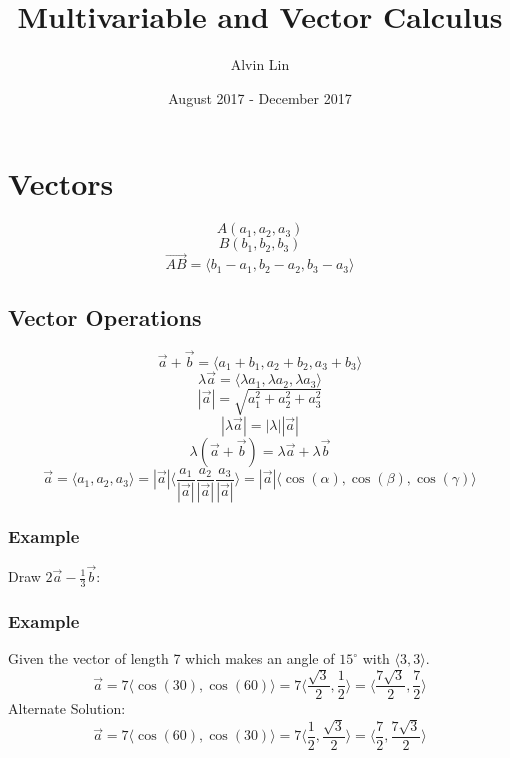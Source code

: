 \documentclass[letterpaper, 12pt]{math}
\title{Multivariable and Vector Calculus}
\author{Alvin Lin}
\date{August 2017 - December 2017}
\begin{document}
\maketitle

\section*{Vectors}
\[ A(a_{1},a_{2},a_{3}) \]
\[ B(b_{1},b_{2},b_{3}) \]
\[ \vec{AB} = \langle b_{1}-a_{1},b_{2}-a_{2},b_{3}-a_{3}\rangle \]

\subsection*{Vector Operations}
\[ \vec{a}+\vec{b} = \langle a_{1}+b_{1},a_{2}+b_{2},a_{3}+b_{3}\rangle \]
\[ \lambda\vec{a} = \langle\lambda a_{1},\lambda a_{2},\lambda a_{3}\rangle \]
\[ |\vec{a}| = \sqrt{a_{1}^{2}+a_{2}^{2}+a_{3}^{2}} \]
\[ |\lambda\vec{a}| = |\lambda||\vec{a}| \]
\[ \lambda(\vec{a}+\vec{b}) = \lambda\vec{a}+\lambda\vec{b} \]
\[ \vec{a} = \langle a_{1},a_{2},a_{3}\rangle =
  |\vec{a}|\langle\frac{a_{1}}{|\vec{a}|}\frac{a_{2}}{|\vec{a}|}
  \frac{a_{3}}{|\vec{a}|}\rangle =
  |\vec{a}|\langle\cos(\alpha),\cos(\beta),\cos(\gamma)\rangle \]

\subsubsection*{Example}
Draw \( 2\vec{a}-\frac{1}{3}\vec{b} \):
\begin{center}
\end{center}

\subsubsection*{Example}
Given the vector of length 7 which makes an angle of \( 15^{\circ} \) with
\( \langle3,3\rangle \).
\[ \vec{a} = 7\langle\cos(30),\cos(60)\rangle =
  7\langle\frac{\sqrt{3}}{2},\frac{1}{2}\rangle =
  \langle\frac{7\sqrt{3}}{2},\frac{7}{2}\rangle \]
Alternate Solution:
\[ \vec{a} = 7\langle\cos(60),\cos(30)\rangle =
  7\langle\frac{1}{2},\frac{\sqrt{3}}{2}\rangle =
  \langle\frac{7}{2},\frac{7\sqrt{3}}{2}\rangle \]
\end{document}

